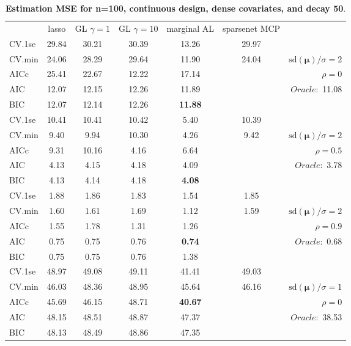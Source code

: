 \clearpage
\begin{table}\vspace{-.5cm}
\caption[l]{ { \bf Estimation MSE for n=100, continuous design, 
dense covariates, and  decay  50}.}
\vspace{-.5cm}
\footnotesize{}
\begin{center}
\begin{tabular}{l*{5}{c}|r}
& lasso & GL $\gamma=1$ & GL $\gamma=10$ & marginal AL & sparsenet MCP  & \\
 \cline{1-7}
CV.1se & 29.84 & 30.21 & 30.39 & 13.26 & 29.97 & \\
CV.min & 24.06 & 28.29 & 29.64 & 11.90 & 24.04 &  $\mathrm{sd}(\mathbf{\mu})/\sigma=2$ \\
AICc & 25.41 & 22.67 & 12.22 & 17.14 & & $\rho=0$ \\
AIC & 12.07 & 12.15 & 12.26 & 11.89 & &  \multirow{2}{*}{$Oracle: $ 11.08} \\
BIC & 12.07 & 12.14 & 12.26 & {\bf 11.88} & &  \\
 \hline 
CV.1se & 10.41 & 10.41 & 10.42 & 5.40 & 10.39 & \\
CV.min & 9.40 & 9.94 & 10.30 & 4.26 & 9.42 &  $\mathrm{sd}(\mathbf{\mu})/\sigma=2$ \\
AICc & 9.31 & 10.16 & 4.16 & 6.64 & & $\rho=0.5$ \\
AIC & 4.13 & 4.15 & 4.18 & 4.09 & &  \multirow{2}{*}{$Oracle: $ 3.78} \\
BIC & 4.13 & 4.14 & 4.18 & {\bf 4.08} & &  \\
 \hline 
CV.1se & 1.88 & 1.86 & 1.83 & 1.54 & 1.85 & \\
CV.min & 1.60 & 1.61 & 1.69 & 1.12 & 1.59 &  $\mathrm{sd}(\mathbf{\mu})/\sigma=2$ \\
AICc & 1.55 & 1.78 & 1.31 & 1.26 & & $\rho=0.9$ \\
AIC & 0.75 & 0.75 & 0.76 & {\bf 0.74} & &  \multirow{2}{*}{$Oracle: $ 0.68} \\
BIC & 0.75 & 0.75 & 0.76 & 1.38 & &  \\
 \hline 
CV.1se & 48.97 & 49.08 & 49.11 & 41.41 & 49.03 & \\
CV.min & 46.03 & 48.36 & 48.95 & 45.64 & 46.16 &  $\mathrm{sd}(\mathbf{\mu})/\sigma=1$ \\
AICc & 45.69 & 46.15 & 48.71 & {\bf 40.67} & & $\rho=0$ \\
AIC & 48.15 & 48.51 & 48.87 & 47.37 & &  \multirow{2}{*}{$Oracle: $ 38.53} \\
BIC & 48.13 & 48.49 & 48.86 & 47.35 & &  \\

\end{tabular}
\end{center}
\end{table}
